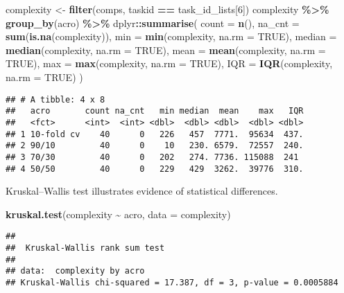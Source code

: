 \documentclass[
]{book}
\newenvironment{Shaded}{\begin{snugshade}}{\end{snugshade}}
\newcommand{\AttributeTok}[1]{\textcolor[rgb]{0.13,0.29,0.53}{#1}}
\newcommand{\ConstantTok}[1]{\textcolor[rgb]{0.56,0.35,0.01}{#1}}
\newcommand{\DecValTok}[1]{\textcolor[rgb]{0.00,0.00,0.81}{#1}}
\newcommand{\FunctionTok}[1]{\textcolor[rgb]{0.13,0.29,0.53}{\textbf{#1}}}
\newcommand{\NormalTok}[1]{#1}
\newcommand{\OtherTok}[1]{\textcolor[rgb]{0.56,0.35,0.01}{#1}}
\newcommand{\SpecialCharTok}[1]{\textcolor[rgb]{0.81,0.36,0.00}{\textbf{#1}}}
\begin{document}
\begin{Shaded}
\begin{Highlighting}[]
\NormalTok{complexity }\OtherTok{\textless{}{-}} \FunctionTok{filter}\NormalTok{(comps, taskid }\SpecialCharTok{==}\NormalTok{ task\_id\_lists[}\DecValTok{6}\NormalTok{])}
\NormalTok{complexity }\SpecialCharTok{\%\textgreater{}\%}
  \FunctionTok{group\_by}\NormalTok{(acro) }\SpecialCharTok{\%\textgreater{}\%}
\NormalTok{  dplyr}\SpecialCharTok{::}\FunctionTok{summarise}\NormalTok{(}
    \AttributeTok{count =} \FunctionTok{n}\NormalTok{(),}
    \AttributeTok{na\_cnt =} \FunctionTok{sum}\NormalTok{(}\FunctionTok{is.na}\NormalTok{(complexity)),}
    \AttributeTok{min =} \FunctionTok{min}\NormalTok{(complexity, }\AttributeTok{na.rm =} \ConstantTok{TRUE}\NormalTok{),}
    \AttributeTok{median =} \FunctionTok{median}\NormalTok{(complexity, }\AttributeTok{na.rm =} \ConstantTok{TRUE}\NormalTok{),}
    \AttributeTok{mean =} \FunctionTok{mean}\NormalTok{(complexity, }\AttributeTok{na.rm =} \ConstantTok{TRUE}\NormalTok{),}
    \AttributeTok{max =} \FunctionTok{max}\NormalTok{(complexity, }\AttributeTok{na.rm =} \ConstantTok{TRUE}\NormalTok{),}
    \AttributeTok{IQR =} \FunctionTok{IQR}\NormalTok{(complexity, }\AttributeTok{na.rm =} \ConstantTok{TRUE}\NormalTok{)}
\NormalTok{  )}
\end{Highlighting}
\end{Shaded}

\begin{verbatim}
## # A tibble: 4 x 8
##   acro       count na_cnt   min median  mean    max   IQR
##   <fct>      <int>  <int> <dbl>  <dbl> <dbl>  <dbl> <dbl>
## 1 10-fold cv    40      0   226   457  7771.  95634  437.
## 2 90/10         40      0    10   230. 6579.  72557  240.
## 3 70/30         40      0   202   274. 7736. 115088  241 
## 4 50/50         40      0   229   429  3262.  39776  310.
\end{verbatim}

Kruskal--Wallis test illustrates evidence of statistical differences.

\begin{Shaded}
\begin{Highlighting}[]
\FunctionTok{kruskal.test}\NormalTok{(complexity }\SpecialCharTok{\textasciitilde{}}\NormalTok{ acro, }\AttributeTok{data =}\NormalTok{ complexity)}
\end{Highlighting}
\end{Shaded}

\begin{verbatim}
## 
##  Kruskal-Wallis rank sum test
## 
## data:  complexity by acro
## Kruskal-Wallis chi-squared = 17.387, df = 3, p-value = 0.0005884
\end{verbatim}
\end{document}
